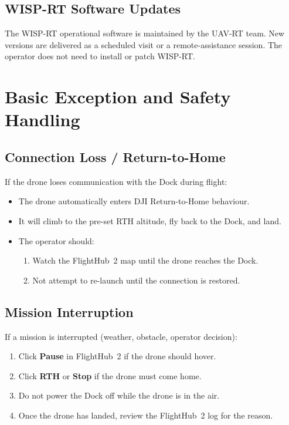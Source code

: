 \documentclass[11pt,letterpaper]{article}
\begin{document}
\subsection{WISP-RT Software Updates}

The WISP-RT operational software is maintained by the UAV-RT team. New
versions are delivered as a scheduled visit or a remote-assistance
session. The operator does not need to install or patch WISP-RT.

\newpage
\section{Basic Exception and Safety Handling}
\label{sec:exceptions}

\subsection{Connection Loss / Return-to-Home}

If the drone loses communication with the Dock during flight:

\begin{itemize}[leftmargin=1.5em]
  \item The drone automatically enters DJI Return-to-Home behaviour.
  \item It will climb to the pre-set RTH altitude, fly back to the Dock, and land.
  \item The operator should:
    \begin{enumerate}[leftmargin=1.2em]
      \item Watch the FlightHub~2 map until the drone reaches the Dock.
      \item Not attempt to re-launch until the connection is restored.
    \end{enumerate}
\end{itemize}

\subsection{Mission Interruption}

If a mission is interrupted (weather, obstacle, operator decision):

\begin{enumerate}[leftmargin=1.5em]
  \item Click \textbf{Pause} in FlightHub~2 if the drone should hover.
  \item Click \textbf{RTH} or \textbf{Stop} if the drone must come home.
  \item Do not power the Dock off while the drone is in the air.
  \item Once the drone has landed, review the FlightHub~2 log for the reason.
\end{enumerate}
\end{document}
